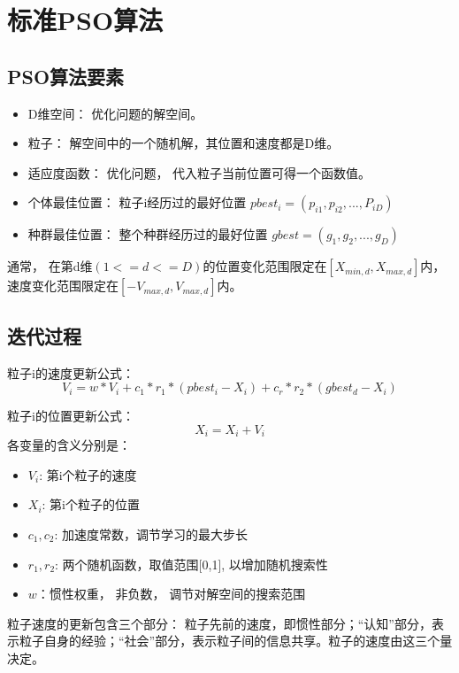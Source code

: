 \documentclass[8pt]{article}
\begin{document}
\section{标准PSO算法}
\subsection{PSO算法要素}
\begin{itemize}[leftmargin=2em]
	\setlength{\itemsep}{0pt}
	\setlength{\parsep}{0pt}
	\setlength{\parskip}{0pt}
	\item D维空间： 优化问题的解空间。
	\item 粒子： 解空间中的一个随机解，其位置和速度都是D维。
	\item 适应度函数： 优化问题， 代入粒子当前位置可得一个函数值。
	\item 个体最佳位置： 粒子i经历过的最好位置 $pbest_i = (p_{i1}, p_{i2}, ..., P_{iD})$
	\item 种群最佳位置： 整个种群经历过的最好位置 $gbest = (g_1, g_2, ..., g_D)$
\end{itemize}
\par
通常， 在第d维$(1<=d<=D)$的位置变化范围限定在$[X_{min,d},X_{max,d}]$内，速度变化范围限定在$[-V_{max,d},V_{max,d}]$内。

\subsection{迭代过程}
粒子i的速度更新公式：
\begin{equation}
	V_i = w * V_i + c_1 * r_1 * (pbest_i - X_i) + c_r * r_2 * (gbest_d - X_i)
\end{equation}
\par
粒子i的位置更新公式：
\begin{equation}
	X_i = X_i + V_i
\end{equation}
各变量的含义分别是：
\begin{itemize}[leftmargin=2em]
	\setlength{\itemsep}{0pt}
	\setlength{\parsep}{0pt}
	\setlength{\parskip}{0pt}
	\item $V_i$: 第i个粒子的速度
	\item $X_i$: 第i个粒子的位置
	\item $c_1, c_2$: 加速度常数，调节学习的最大步长
	\item $r_1, r_2$: 两个随机函数，取值范围[0,1], 以增加随机搜索性
	\item $w$：惯性权重， 非负数， 调节对解空间的搜索范围
\end{itemize}

\par
粒子速度的更新包含三个部分： 粒子先前的速度，即惯性部分；“认知”部分，表示粒子自身的经验；“社会”部分，表示粒子间的信息共享。粒子的速度由这三个量决定。
\end{document}
